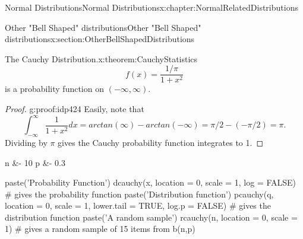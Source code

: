 \documentclass[oneside,10pt,]{book}
\numberwithin{equation}{section}
\begin{document}
\begin{chapterptx}{Normal Distributions}{}{Normal Distributions}{}{}{x:chapter:NormalRelatedDistributions}
\begin{sectionptx}{Other "Bell Shaped" distributions}{}{Other "Bell Shaped" distributions}{}{}{x:section:OtherBellShapedDistributions}
\begin{theorem}{The Cauchy Distribution.}{}{x:theorem:CauchyStatistics}
\begin{equation*}
f(x) = \frac{1/\pi}{1+x^2}
\end{equation*}
is a probability function on \((-\infty, \infty)\).\end{theorem}
\begin{proof}{}{g:proof:idp424}
Easily, note that%
\begin{equation*}
\int_{-\infty}^{\infty} \frac{1}{1+x^2} dx = arctan(\infty) - arctan(-\infty) = \pi/2 - (-\pi/2) = \pi.
\end{equation*}
Dividing by \(\pi\) gives the Cauchy probability function integrates to 1.\end{proof}
\begin{sageinput}
n &- 10
p &- 0.3

paste('Probability Function')
dcauchy(x, location = 0, scale = 1, log = FALSE)   # gives the probability function
paste('Distribution function')
pcauchy(q, location = 0, scale = 1, lower.tail = TRUE, log.p = FALSE)
   # gives the distribution function
paste('A random sample')
rcauchy(n, location = 0, scale = 1)    # gives a random sample of 15 items from b(n,p)


\end{sageinput}
\end{sectionptx}
\end{chapterptx}
\end{document}
